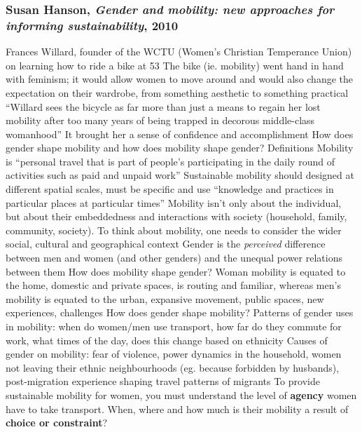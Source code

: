 \documentclass{article}
\begin{document}
\subsubsection{Susan Hanson, \textit{Gender and mobility: new approaches for informing sustainability}, 2010}

\begin{outline}
	\1 Frances Willard, founder of the WCTU (Women's Christian Temperance Union) on learning how to ride a bike at 53
		\2 The bike (ie. mobility) went hand in hand with feminism; it would allow women to move around and would also change the expectation on their wardrobe, from something aesthetic to something practical
		 \2 ``Willard sees the bicycle as far more than just a means to regain her lost mobility after too many years of being trapped in decorous middle-class womanhood''
		\2 It brought her a sense of confidence and accomplishment
	\1 How does gender shape mobility and how does mobility shape gender?
	\1 Definitions
		\2 Mobility is ``personal travel that is part of people's participating in the daily round of activities such as paid and unpaid work''
		\2 Sustainable mobility should designed at different spatial scales, must be specific and use ``knowledge and practices in particular places at particular times''
		\2 Mobility isn't only about the individual, but about their embeddedness and interactions with society (household, family, community, society).  To think about mobility, one needs to consider the wider social, cultural and geographical context
		\2 Gender is the \textit{perceived} difference between men and women (and other genders) and the unequal power relations between them
	\1 How does mobility shape gender?
		\2 Woman mobility is equated to the home, domestic and private spaces, is routing and familiar, whereas men's mobility is equated to the urban, expansive movement, public spaces, new experiences, challenges
	\1 How does gender shape mobility?
		\2 Patterns of gender uses in mobility: when do women/men use transport, how far do they commute for work, what times of the day, does this change based on ethnicity
		\2 Causes of gender on mobility: fear of violence, power dynamics in the household, women not leaving their ethnic neighbourhoods (eg. because forbidden by husbands), post-migration experience shaping travel patterns of migrants
	\1 To provide sustainable mobility for women, you must understand the level of \textbf{agency} women have to take transport. When, where and how much is their mobility a result of \textbf{choice or constraint}?
\end{outline}
\end{document}
